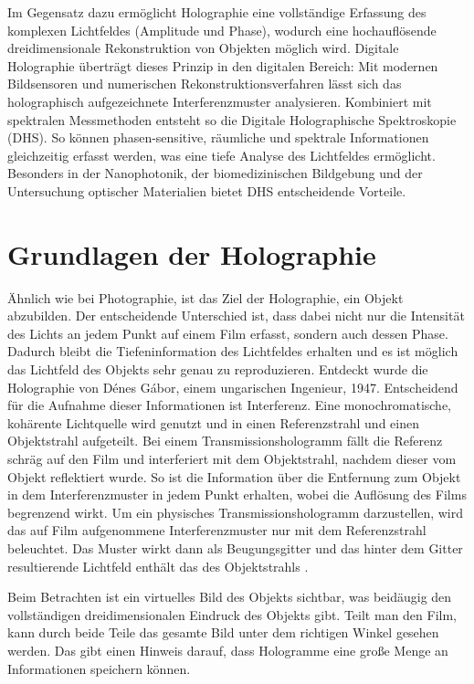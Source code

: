 \documentclass[10pt,twocolumn,a4paper]{article}
\begin{document}
Im Gegensatz dazu ermöglicht Holographie eine vollständige Erfassung des komplexen Lichtfeldes (Amplitude und Phase), wodurch eine hochauflösende dreidimensionale Rekonstruktion von Objekten möglich wird. Digitale Holographie überträgt dieses Prinzip in den digitalen Bereich: Mit modernen Bildsensoren und numerischen Rekonstruktionsverfahren lässt sich das holographisch aufgezeichnete Interferenzmuster analysieren. Kombiniert mit spektralen Messmethoden entsteht so die Digitale Holographische Spektroskopie (DHS). So können phasen-sensitive, räumliche und spektrale Informationen gleichzeitig erfasst werden, was eine tiefe Analyse des Lichtfeldes ermöglicht. Besonders in der Nanophotonik, der biomedizinischen Bildgebung und der Untersuchung optischer Materialien bietet DHS entscheidende Vorteile.

\section{Grundlagen der Holographie}
Ähnlich wie bei Photographie, ist das Ziel der Holographie, ein Objekt abzubilden. Der entscheidende Unterschied ist, dass dabei nicht nur die Intensität des Lichts an jedem Punkt auf einem Film erfasst, sondern auch dessen Phase. Dadurch bleibt die Tiefeninformation des Lichtfeldes erhalten und es ist möglich das Lichtfeld des Objekts sehr genau zu reproduzieren. Entdeckt wurde die Holographie von Dénes Gábor, einem ungarischen Ingenieur, 1947. Entscheidend für die Aufnahme dieser Informationen ist Interferenz. Eine monochromatische, kohärente Lichtquelle wird genutzt und in einen Referenzstrahl und einen Objektstrahl aufgeteilt. Bei einem Transmissionshologramm fällt die Referenz schräg auf den Film und interferiert mit dem Objektstrahl, nachdem dieser vom Objekt reflektiert wurde. So ist die Information über die Entfernung zum Objekt in dem Interferenzmuster in jedem Punkt erhalten, wobei die Auflösung des Films begrenzend wirkt. Um ein physisches Transmissionshologramm darzustellen, wird das auf Film aufgenommene Interferenzmuster nur mit dem Referenzstrahl beleuchtet. Das Muster wirkt dann als Beugungsgitter und das hinter dem Gitter resultierende Lichtfeld enthält das des Objektstrahls \cite{Gabor}.

Beim Betrachten ist ein virtuelles Bild des Objekts sichtbar, was beidäugig den vollständigen dreidimensionalen Eindruck des Objekts gibt. Teilt man den Film, kann durch beide Teile das gesamte Bild unter dem richtigen Winkel gesehen werden. Das gibt einen Hinweis darauf, dass Hologramme eine große Menge an Informationen speichern können.
\end{document}
